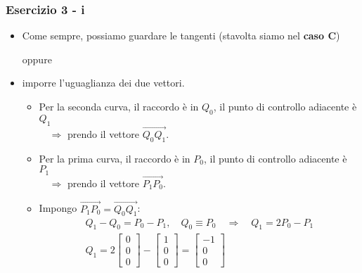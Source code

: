 \documentclass{beamer}
\begin{document}
\begin{frame}
	\frametitle{Esercizio 3 - i}
	\begin{itemize} 
            \item Come sempre, possiamo guardare le tangenti (stavolta siamo nel \textbf{caso C}) \\ 
                \begin{centering}
                oppure\\ 
                \end{centering}
                
                \vspace{0.25cm}
                
            \item imporre l'uguaglianza dei due vettori.
            \begin{itemize} 
                \item Per la seconda curva, il raccordo \`e in $Q_0$, il punto di controllo adiacente \`e $Q_1$ \\
                    $\quad \Rightarrow$ prendo il vettore $\overrightarrow {Q_0 Q_1}$.
                \item Per la prima curva, il raccordo \`e in $P_0$, il punto di controllo adiacente \`e $P_1$\\
                    $\quad \Rightarrow$ prendo il vettore $\overrightarrow {P_1 P_0}$.

                \item Impongo $\overrightarrow {P_1 P_0} = \overrightarrow {Q_0 Q_1}$:
                    \begin{gather*}
                        Q_1 - Q_0 = P_0 - P_1, \quad Q_0 \equiv P_0 \quad \Rightarrow \quad Q_1 = 2P_0 - P_1 \\
                        Q_1 = 2 \begin{bmatrix} 0 \\ 0 \\ 0 \end{bmatrix} - \begin{bmatrix} 1 \\ 0 \\ 0 \end{bmatrix} = \begin{bmatrix} -1 \\ 0 \\ 0 \end{bmatrix}
                    \end{gather*}
            \end{itemize}
	\end{itemize}
\end{frame}
\end{document}

